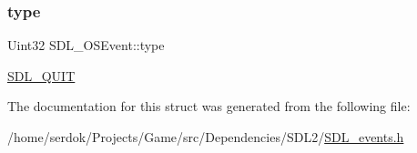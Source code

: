 \subsubsection{\texorpdfstring{type}{type}}
{\footnotesize\ttfamily Uint32 S\+D\+L\+\_\+\+O\+S\+Event\+::type}

\hyperlink{SDL__events_8h_a3b589e89be6b35c02e0dd34a55f3fccaa31acc5fdafc86ebe2c1f5c3cae48d603}{S\+D\+L\+\_\+\+Q\+U\+IT} 

The documentation for this struct was generated from the following file\+:\begin{DoxyCompactItemize}
\item 
/home/serdok/\+Projects/\+Game/src/\+Dependencies/\+S\+D\+L2/\hyperlink{SDL__events_8h}{S\+D\+L\+\_\+events.\+h}\end{DoxyCompactItemize}
